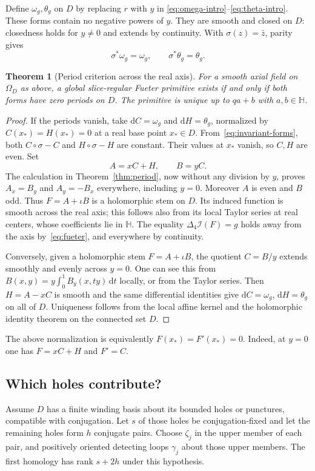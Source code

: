 \documentclass[11pt,a4paper]{article}
\numberwithin{equation}{section}
\newtheorem{theorem}{Theorem}[section]
\theoremstyle{definition}
\theoremstyle{remark}
\newcommand{\HH}{\mathbb H}
\newcommand{\Lap}{\Delta_4}
\newcommand{\ind}{\mathcal I}
\newcommand{\dd}{\,\mathrm d}
\begin{document}
Define $\omega_g,\theta_g$ on $D$ by replacing $r$ with $y$ in
\eqref{eq:omega-intro}--\eqref{eq:theta-intro}. These forms contain no
negative powers of $y$. They are smooth and closed on $D$: closedness
holds for $y\ne0$ and extends by continuity. With $\sigma(z)=\bar z$,
parity gives
\begin{equation}
 \sigma^*\omega_g=\omega_g,\qquad \sigma^*\theta_g=\theta_g.
 \label{eq:invariant-forms}
\end{equation}

\begin{theorem}[Period criterion across the real axis]\label{thm:real-period}
For a smooth axial field on $\Omega_D$ as above, a global
slice-regular Fueter primitive exists if and only if both forms have
zero periods on $D$. The primitive is unique up to $qa+b$ with
$a,b\in\HH$.
\end{theorem}
\begin{proof}
If the periods vanish, take $\mathrm dC=\omega_g$ and
$\mathrm dH=\theta_g$, normalized by $C(x_*)=H(x_*)=0$ at a real
base point $x_*\in D$. From~\eqref{eq:invariant-forms}, both
$C\circ\sigma-C$ and $H\circ\sigma-H$ are constant. Their values at
$x_*$ vanish, so $C,H$ are even. Set
\[
 A=xC+H,\qquad B=yC.
\]
The calculation in Theorem~\ref{thm:period}, now without any division by
$y$, proves $A_x=B_y$ and $A_y=-B_x$ everywhere, including $y=0$.
Moreover $A$ is even and $B$ odd. Thus $F=A+\iota B$ is a holomorphic
stem on $D$. Its induced function is smooth across the real axis;
this follows also from its local Taylor series at real centers, whose
coefficients lie in $\HH$. The equality $\Lap\ind(F)=g$ holds away
from the axis by~\eqref{eq:fueter}, and everywhere by continuity.

Conversely, given a holomorphic stem $F=A+\iota B$, the quotient
$C=B/y$ extends smoothly and evenly across $y=0$. One can see this from
$B(x,y)=y\int_0^1 B_y(x,ty)\dd t$ locally, or from the Taylor series.
Then $H=A-xC$ is smooth and the same differential identities give
$\mathrm dC=\omega_g$, $\mathrm dH=\theta_g$ on all of $D$.
Uniqueness follows from the local affine kernel and the holomorphic
identity theorem on the connected set $D$.
\end{proof}
The above normalization is equivalently $F(x_*)=F'(x_*)=0$.
Indeed, at $y=0$ one has $F=xC+H$ and $F'=C$.

\subsection{Which holes contribute?}
Assume $D$ has a finite winding basis about its bounded holes or
punctures, compatible with conjugation. Let $s$ of those holes be
conjugation-fixed and let the remaining holes form $h$ conjugate pairs.
Choose $\zeta_j$ in the upper member of each pair, and positively
oriented detecting loops $\gamma_j$ about those upper members.
The first homology has rank $s+2h$ under this hypothesis.
\end{document}
